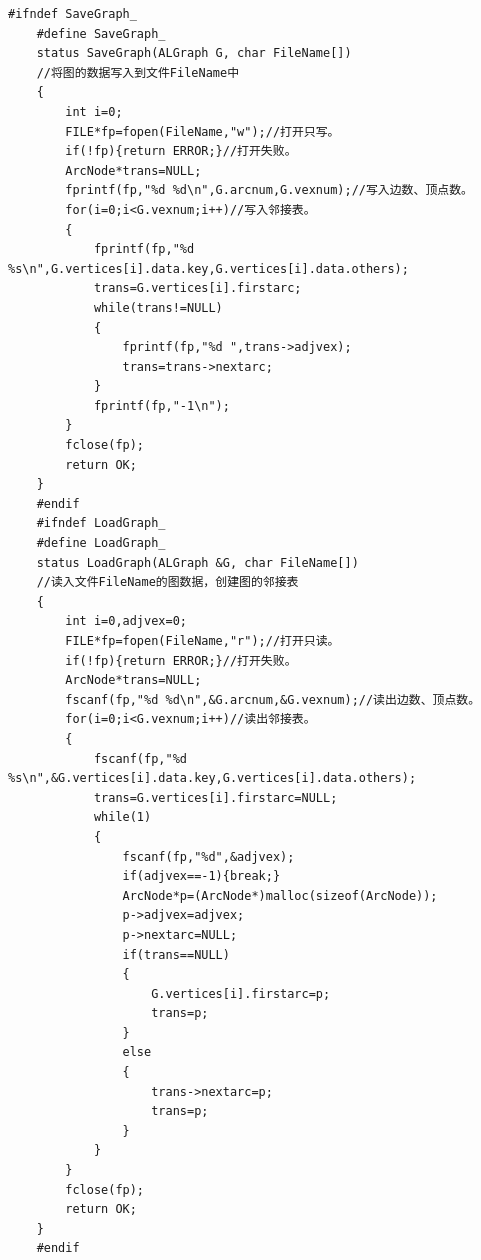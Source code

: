 \documentclass[supercite]{Experimental_Report}
\theoremstyle{definition}
\begin{document}
\begin{lstlisting}[title=文件操作,frame=none]
	#ifndef SaveGraph_
	#define SaveGraph_
	status SaveGraph(ALGraph G, char FileName[])
	//将图的数据写入到文件FileName中
	{
		int i=0;
		FILE*fp=fopen(FileName,"w");//打开只写。 
		if(!fp){return ERROR;}//打开失败。 
		ArcNode*trans=NULL;
		fprintf(fp,"%d %d\n",G.arcnum,G.vexnum);//写入边数、顶点数。 
		for(i=0;i<G.vexnum;i++)//写入邻接表。 
		{
			fprintf(fp,"%d %s\n",G.vertices[i].data.key,G.vertices[i].data.others);
			trans=G.vertices[i].firstarc;
			while(trans!=NULL)
			{
				fprintf(fp,"%d ",trans->adjvex);
				trans=trans->nextarc;
			}
			fprintf(fp,"-1\n");
		}
		fclose(fp);
		return OK;
	}
	#endif
	#ifndef LoadGraph_
	#define LoadGraph_
	status LoadGraph(ALGraph &G, char FileName[])
	//读入文件FileName的图数据，创建图的邻接表
	{
		int i=0,adjvex=0;
		FILE*fp=fopen(FileName,"r");//打开只读。 
		if(!fp){return ERROR;}//打开失败。 
		ArcNode*trans=NULL;
		fscanf(fp,"%d %d\n",&G.arcnum,&G.vexnum);//读出边数、顶点数。 
		for(i=0;i<G.vexnum;i++)//读出邻接表。
		{
			fscanf(fp,"%d %s\n",&G.vertices[i].data.key,G.vertices[i].data.others);
			trans=G.vertices[i].firstarc=NULL;
			while(1)
			{
				fscanf(fp,"%d",&adjvex);
				if(adjvex==-1){break;}
				ArcNode*p=(ArcNode*)malloc(sizeof(ArcNode));
				p->adjvex=adjvex;
				p->nextarc=NULL;
				if(trans==NULL)
				{
					G.vertices[i].firstarc=p;
					trans=p;
				}
				else
				{
					trans->nextarc=p;
					trans=p;
				}
			}
		}
		fclose(fp);
		return OK;
	}
	#endif
\end{lstlisting}
\end{document}
